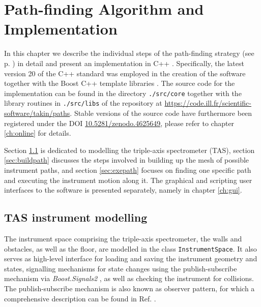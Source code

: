 %
%

\chapter{Path-finding Algorithm and Implementation}
\label{ch:impl}

In this chapter we describe the individual steps of the path-finding strategy (see p. \pageref{sec:strategy}) 
in detail and present an implementation in C++ \cite{Stroustrup2008, Stroustrup2018}. 
Specifically, the latest version 20 of the C++ standard \cite{ISOCPP20} was employed in the creation of the software
together with the Boost C++ template libraries \cite{web_boost}. The source code for the implementation
can be found in the directory \lstinline|./src/core| together with the library routines in \lstinline|./src/libs|
of the repository at \url{https://code.ill.fr/scientific-software/takin/paths}. Stable versions of the
source code have furthermore been registered under the DOI \href{https://doi.org/10.5281/zenodo.4625649}{10.5281/zenodo.4625649},
please refer to chapter \ref{ch:online} for details.

Section \ref{sec:tasmodel} is dedicated to modelling the triple-axis spectrometer (TAS), 
section \ref{sec:buildpath} discusses the steps involved in building up the mesh of possible instrument paths, 
and section \ref{sec:exepath} focuses on finding one specific path and executing the instrument motion along it.
The graphical and scripting user interfaces to the software is presented separately, namely in chapter \ref{ch:gui}.




\section{TAS instrument modelling}
\label{sec:tasmodel}

The instrument space comprising the triple-axis spectrometer, the walls and obstacles, as well as the floor, are modelled in
the class \lstinline[language=C++]|InstrumentSpace|. It also serves as high-level interface for loading and saving
the instrument geometry and states, signalling mechanisms for state changes using the publish-subscribe mechanism
via \textit{Boost.Signals2} \cite{web_boost_signals}, as well as checking the instrument for collisions.
The publish-subscribe mechanism is also known as observer pattern, for which a comprehensive description 
can be found in Ref. \cite[Ch. 4, pp. 122-127]{FUH_prog2019}.

